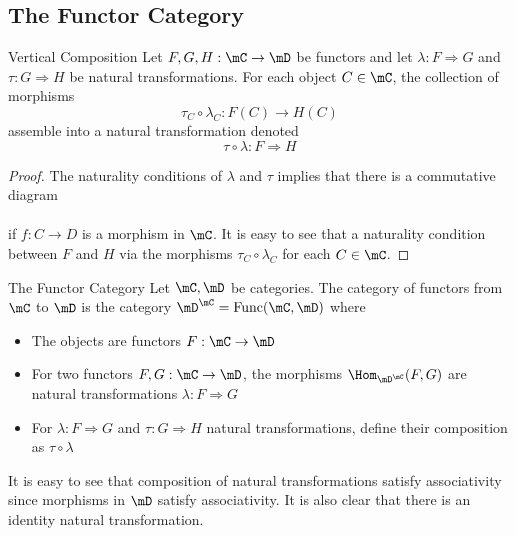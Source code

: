 \documentclass[a4paper]{article}
\begin{document}
\subsection{The Functor Category}
\begin{prp}{Vertical Composition}{} Let $F,G,H:\mC\to\mD$ be functors and let $\lambda:F\Rightarrow G$ and $\tau:G\Rightarrow H$ be natural transformations. For each object $C\in\mC$, the collection of morphisms $$\tau_C\circ\lambda_C:F(C)\to H(C)$$ assemble into a natural transformation denoted $$\tau\circ\lambda:F\Rightarrow H$$ 
\begin{proof}
The naturality conditions of $\lambda$ and $\tau$ implies that there is a commutative diagram \\
\\
if $f:C\to D$ is a morphism in $\mC$. It is easy to see that a naturality condition between $F$ and $H$ via the morphisms $\tau_C\circ\lambda_C$ for each $C\in\mC$. 
\end{proof}
\end{prp}

\begin{defn}{The Functor Category}{} Let $\mC,\mD$ be categories. The category of functors from $\mC$ to $\mD$ is the category $\mD^\mC=\text{Func}(\mC,\mD)$ where
\begin{itemize}
\item The objects are functors $F:\mC\to\mD$
\item For two functors $F,G:\mC\to\mD$, the morphisms $\Hom_{\mD^\mC}(F,G)$ are natural transformations $\lambda:F\Rightarrow G$
\item For $\lambda:F\Rightarrow G$ and $\tau:G\Rightarrow H$ natural transformations, define their composition as $\tau\circ\lambda$
\end{itemize}
\end{defn}

It is easy to see that composition of natural transformations satisfy associativity since morphisms in $\mD$ satisfy associativity. It is also clear that there is an identity natural transformation. 
\end{document}
